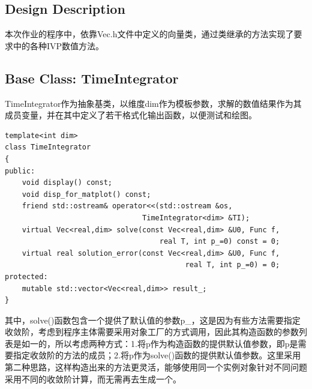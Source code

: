 \documentclass[a4paper,11.5pt,UTF8]{ctexart}
\begin{document}
\begin{large}

\section{Design Description}
\par 本次作业的程序中，依靠Vec.h文件中定义的向量类，通过类继承的方法实现了要求中的各种IVP数值方法。
\subsection{Base Class: TimeIntegrator}
\par TimeIntegrator作为抽象基类，以维度dim作为模板参数，求解的数值结果作为其成员变量，并在其中定义了若干格式化输出函数，以便测试和绘图。
\begin{lstlisting}
template<int dim>
class TimeIntegrator
{
public:
    void display() const;
    void disp_for_matplot() const;
    friend std::ostream& operator<<(std::ostream &os,
                                TimeIntegrator<dim> &TI);
    virtual Vec<real,dim> solve(const Vec<real,dim> &U0, Func f, 
                                    real T, int p_=0) const = 0;
    virtual real solution_error(const Vec<real,dim> &U0, Func f, 
                                          real T, int p_=0) = 0;
protected:
    mutable std::vector<Vec<real,dim>> result_;
}
\end{lstlisting}
其中，solve()函数包含一个提供了默认值的参数p\_，这是因为有些方法需要指定收敛阶，考虑到程序主体需要采用对象工厂的方式调用，因此其构造函数的参数列表是如一的，所以考虑两种方式：1.将p作为构造函数的提供默认值参数，即p是需要指定收敛阶的方法的成员；2.将p作为solve()函数的提供默认值参数。这里采用第二种思路，这样构造出来的方法更灵活，能够使用同一个实例对象针对不同问题采用不同的收敛阶计算，而无需再去生成一个。


\end{large}
\end{document}
